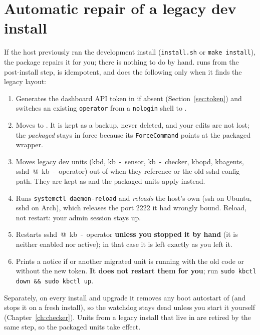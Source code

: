 \section{Automatic repair of a legacy dev install}
\label{sec:migrate}
If the host previously ran the development install (\texttt{install.sh} or \texttt{make install}), the package
repairs it for you; there is nothing to do by hand.  runs from the post-install
step, is idempotent, and does the following only when it finds the legacy layout:
\begin{enumerate}
\item Generates the dashboard API token in  if absent (Section~\ref{sec:token}) and switches an existing \texttt{operator} from a \texttt{nologin} shell to .
\item Moves  to . It is kept as a backup, never deleted, and your edits are not lost; the \emph{packaged}  stays in force because its \texttt{ForceCommand} points at the packaged wrapper.
\item Moves legacy dev units (\unit{kbd}, \unit{kb-sensor}, \unit{kb-checker}, \unit{kbopd}, \unit{kbagents}, \unit{sshd@kb-operator}) out of  when they reference  or the old sshd config path. They are kept as  and the packaged units apply instead.
\item Runs \texttt{systemctl daemon-reload} and \emph{reloads} the host's own  (\unit{ssh} on Ubuntu, \unit{sshd} on Arch), which releases the port 2222 it had wrongly bound. Reload, not restart: your admin session stays up.
\item Restarts \unit{sshd@kb-operator} \textbf{unless you stopped it by hand} (it is neither enabled nor active); in that case it is left exactly as you left it.
\item Prints a notice if  or another migrated unit is running with the old code or without the new token. \textbf{It does not restart them for you}; run \texttt{sudo kbctl down \&\& sudo kbctl up}.
\end{enumerate}
Separately, on every install and upgrade it removes any boot autostart of  (and stops it on a fresh
install), so the watchdog stays dead unless you start it yourself (Chapter~\ref{ch:checker}). Units from a legacy
install that live in  are retired by the same step, so the packaged units take effect.

